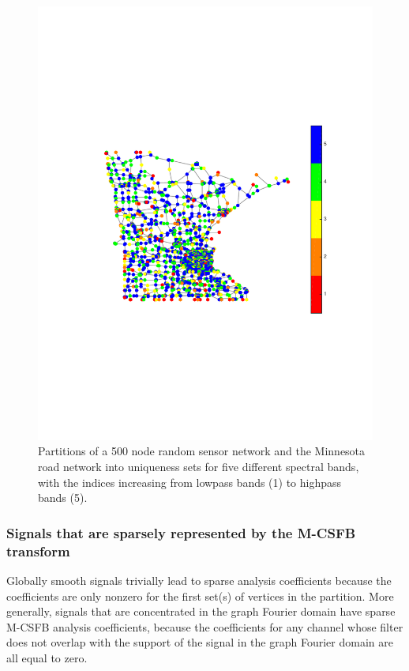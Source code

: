 \documentclass[journal, 10pt]{IEEEtran}
\begin{document}
\begin{figure}[t]
\begin{minipage}[m]{0.05\linewidth}
\end{minipage}
\hspace{.003\linewidth}
\begin{minipage}[m]{0.46\linewidth}
\centerline{\includegraphics[width=.9\linewidth]{fig_uniq_part_minn4}}
\end{minipage}
\caption{Partitions of a 500 node random sensor network and the Minnesota road network \cite{gleich} into uniqueness sets for five different spectral bands, with the indices increasing from lowpass bands (1) to highpass bands (5).} \label{Fig:part_examples}
\end{figure} 

\subsubsection{Signals that are sparsely represented by the M-CSFB transform}
Globally smooth signals trivially lead to sparse analysis coefficients because the coefficients are only nonzero for the first set(s) of vertices in the partition. More generally, signals that are concentrated in the graph Fourier domain %
have sparse M-CSFB analysis coefficients, because the coefficients for any channel whose filter does not overlap with the support of the signal in the graph Fourier domain are all equal to zero. 
\end{document}
